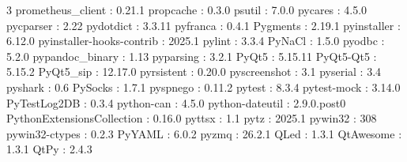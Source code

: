 \begin{multicols}{3}
prometheus\_client : 0.21.1\newline
propcache : 0.3.0\newline
psutil : 7.0.0\newline
pycares : 4.5.0\newline
pycparser : 2.22\newline
pydotdict : 3.3.11\newline
pyfranca : 0.4.1\newline
Pygments : 2.19.1\newline
pyinstaller : 6.12.0\newline
pyinstaller-hooks-contrib : 2025.1\newline
pylint : 3.3.4\newline
PyNaCl : 1.5.0\newline
pyodbc : 5.2.0\newline
pypandoc\_binary : 1.13\newline
pyparsing : 3.2.1\newline
PyQt5 : 5.15.11\newline
PyQt5-Qt5 : 5.15.2\newline
PyQt5\_sip : 12.17.0\newline
pyrsistent : 0.20.0\newline
pyscreenshot : 3.1\newline
pyserial : 3.4\newline
pyshark : 0.6\newline
PySocks : 1.7.1\newline
pyspnego : 0.11.2\newline
pytest : 8.3.4\newline
pytest-mock : 3.14.0\newline
PyTestLog2DB : 0.3.4\newline
python-can : 4.5.0\newline
python-dateutil : 2.9.0.post0\newline
PythonExtensionsCollection : 0.16.0\newline
pyttsx : 1.1\newline
pytz : 2025.1\newline
pywin32 : 308\newline
pywin32-ctypes : 0.2.3\newline
PyYAML : 6.0.2\newline
pyzmq : 26.2.1\newline
QLed : 1.3.1\newline
QtAwesome : 1.3.1\newline
QtPy : 2.4.3\newline

\end{multicols}
